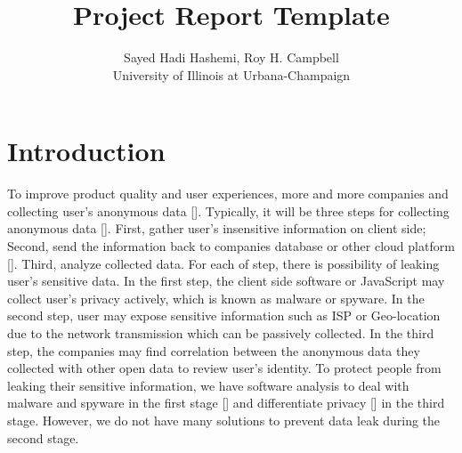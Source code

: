 \documentclass[twocolumn]{article}
\begin{document}
\title{Project Report Template}
\author{Sayed Hadi Hashemi, Roy H. Campbell \\ \small University of Illinois at Urbana-Champaign}
\date{}
\maketitle
\section{Introduction}

To improve product quality and user experiences, more and more companies and collecting user's anonymous data []. Typically, it will be three steps for collecting anonymous data []. First, gather user's insensitive information on client side; Second, send the information back to companies database or other cloud platform []. Third, analyze collected data. For each of  step, there is possibility of leaking user's sensitive data. In the first step, the client side software or JavaScript may collect user's privacy actively, which is known as malware or spyware. In the second step, user may expose sensitive information such as ISP or Geo-location due to the network transmission which can be passively collected. In the third step, the companies may find correlation between the anonymous data they collected with other open data to review user's identity. To protect people from leaking their sensitive information, we have software analysis to deal with malware and spyware in the first stage [] and differentiate privacy [] in the third stage. However, we do not have many solutions to prevent data leak during the second stage.
\end{document}

